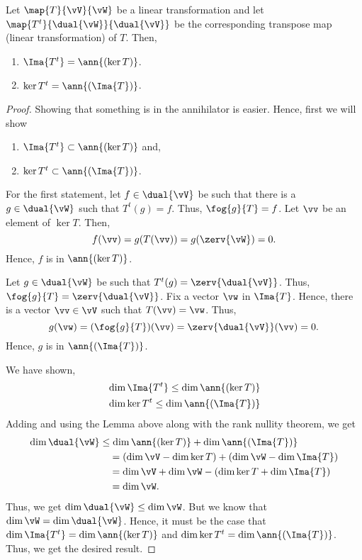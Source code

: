 \begin{Lemma}
    Let $\map{T}{\vV}{\vW}$ be a linear transformation and let $\map{T^{t}}{\dual{\vW}}{\dual{\vV}}$ be the
    corresponding transpose map (linear transformation) of $T$. Then,
    \begin{enumerate}
	\item
	    $\Ima{T^{t}} = \ann{(\ker{T})}$.
	\item
	    $\ker{T^{t}} = \ann{(\Ima{T})}$.
    \end{enumerate}
\end{Lemma}
\begin{proof}
    Showing that something is in the annihilator is easier. Hence, first we will show 
    \begin{enumerate}
	\item
	    $\Ima{T^{t}} \subset \ann{(\ker{T})}$ and,
	\item
	    $\ker{T^{t}} \subset \ann{(\Ima{T})}$.
    \end{enumerate}
    For the first statement, let $f\in \dual{\vV}$ be such that there is a $g\in \dual{\vW}$ such that 
    $T^{t}(g) = f$. Thus, $\fog{g}{T} = f$. Let $\vv$ be an element of $\ker{T}$. Then,
    \[f(\vv) = g(T(\vv)) = g(\zerv{\vW}) = 0.\]
    Hence, $f$ is in $\ann{(\ker{T})}$.

    Let $g \in \dual{\vW}$ be such that $T^{t}(g) = \zerv{\dual{\vV}}$. Thus, $\fog{g}{T} =
    \zerv{\dual{\vV}}$. Fix a vector $\vw$ in $\Ima{T}$. Hence, there is a vector $\vv \in \vV$ such that
    $T(\vv) = \vw$. Thus, \[g(\vw) = (\fog{g}{T})(\vv) = \zerv{\dual{\vV}}(\vv) = 0.\]
    Hence, $g$ is in $\ann{(\Ima{T})}$.

    We have shown,
    \begin{align*}
	& \dim{\Ima{T^{t}}} \leq \dim\ann{(\ker{T})}\\
	& \dim{\ker{T^{t}}} \leq \dim\ann{(\Ima{T})}
    \end{align*}
    Adding and using the Lemma above along with the rank nullity theorem, we get
    \begin{align*}
	\dim{\dual{\vW}} &\leq \dim\ann{(\ker{T})} + \dim\ann{(\Ima{T})} \\
	&\quad = (\dim{\vV} - \dim{\ker{T}}) + (\dim{\vW} - \dim{\Ima{T}})\\
	&\quad = \dim{\vV} + \dim{\vW} - (\dim{\ker{T}} + \dim{\Ima{T}})\\
	&\quad = \dim{\vW}.
    \end{align*}
    Thus, we get $\dim{\dual{\vW}} \leq \dim{\vW}$. But we know that $\dim{\vW} = \dim{\dual{\vW}}$. Hence, it
    must be the case that $\dim{\Ima{T^{t}}} = \dim\ann{(\ker{T})}$ and
    $\dim{\ker{T^{t}}} = \dim\ann{(\Ima{T})}$. Thus, we get the desired result.

\end{proof}
